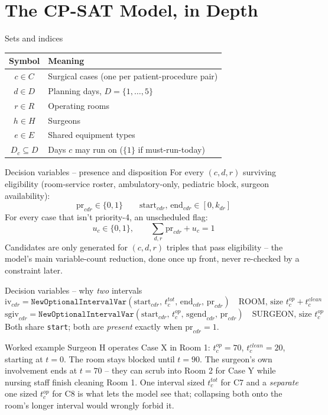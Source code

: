 \documentclass[aspectratio=169]{beamer}
\newcommand{\backbutton}{%
  \hfill\hyperlink{toc}{\beamerreturnbutton{Agenda}}%
}
\begin{document}
\section{The CP-SAT Model, in Depth}

\begin{frame}{Sets and indices}
  \begin{center}
  \begin{tabular}{cl}
    \toprule
    Symbol & Meaning \\
    \midrule
    $c \in C$ & Surgical cases (one per patient-procedure pair) \\
    $d \in D$ & Planning days, $D=\{1,\dots,5\}$ \\
    $r \in R$ & Operating rooms \\
    $h \in H$ & Surgeons \\
    $e \in E$ & Shared equipment types \\
    $D_c \subseteq D$ & Days $c$ may run on ($\{1\}$ if must-run-today) \\
    \bottomrule
  \end{tabular}
  \end{center}
  \backbutton
\end{frame}

\begin{frame}{Decision variables -- presence and disposition}
  For every $(c,d,r)$ surviving eligibility (room-service roster,
  ambulatory-only, pediatric block, surgeon availability):
  \[
    \text{pr}_{cdr}\in\{0,1\} \qquad \text{start}_{cdr},\,\text{end}_{cdr}\in[0,k_{dr}]
  \]
  For every case that isn't priority-4, an unscheduled flag:
  \[
    u_c\in\{0,1\}, \qquad \sum_{d,r}\text{pr}_{cdr} + u_c = 1
  \]
  \footnotesize Candidates are only generated for $(c,d,r)$ triples that
  pass eligibility -- the model's main variable-count reduction, done once
  up front, never re-checked by a constraint later.
\end{frame}

\begin{frame}{Decision variables -- why \emph{two} intervals}
  \[
    \text{iv}_{cdr} = \texttt{NewOptionalIntervalVar}(\text{start}_{cdr},\,t_c^{tot},\,\text{end}_{cdr},\,\text{pr}_{cdr})
    \quad\text{ROOM, size } t_c^{op}+t_c^{clean}
  \]
  \[
    \text{sgiv}_{cdr} = \texttt{NewOptionalIntervalVar}(\text{start}_{cdr},\,t_c^{op},\,\text{sgend}_{cdr},\,\text{pr}_{cdr})
    \quad\text{SURGEON, size } t_c^{op}
  \]
  Both share \texttt{start}; both are \emph{present} exactly when
  $\text{pr}_{cdr}=1$.
  \pause
  \begin{block}{Worked example}
    Surgeon H operates Case X in Room 1: $t_c^{op}=70$, $t_c^{clean}=20$,
    starting at $t=0$. The room stays blocked until $t=90$. The surgeon's
    own involvement ends at $t=70$ -- they can scrub into Room 2 for Case Y
    while nursing staff finish cleaning Room 1. One interval sized
    $t_c^{tot}$ for C7 and a \emph{separate} one sized $t_c^{op}$ for C8 is
    what lets the model see that; collapsing both onto the room's longer
    interval would wrongly forbid it.
  \end{block}
\end{frame}
\end{document}
